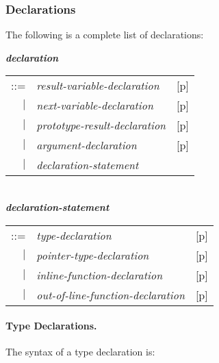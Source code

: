 \documentclass[12pt]{article}
\newcommand{\subsubsubsection}[1]{\paragraph[#1]{#1.}}
\newcommand{\emkey}[1]{{\em \bfseries #1}}
\newcommand{\pagref}[1]{p\pageref{#1}}
\newenvironment{indpar}[1][0.3in]%
	{\begin{list}{}%
		     {\setlength{\itemsep}{0in}%
		      \setlength{\topsep}{0in}%
		      \setlength{\parsep}{1ex}%
		      \setlength{\labelwidth}{#1}%
		      \setlength{\leftmargin}{#1}%
		      \addtolength{\leftmargin}{\labelsep}}%
	 \item}%
	{\end{list}}
\begin{document}
\subsubsection{Declarations}
\label{DECLARATIONS}

The following is a complete list of declarations:
\begin{indpar}
\emkey{declaration}\label{DECLARATION}
    \begin{tabular}[t]{@{}rll}
    ::= & {\em result-variable-declaration}
        & [\pagref{RESULT-VARIABLE-DECLARATION}] \\
    $|$ & {\em next-variable-declaration}
        & [\pagref{NEXT-VARIABLE-DECLARATION}] \\
    $|$ & {\em prototype-result-declaration}
        & [\pagref{PROTOTYPE-RESULT-DECLARATION}] \\
    $|$ & {\em argument-declaration}
        & [\pagref{ARGUMENT-DECLARATION}] \\
    $|$ & {\em declaration-statement} \\
    \end{tabular}
\\[0.5ex]
\emkey{declaration-statement}\label{DECLARATION-STATEMENT}
    \begin{tabular}[t]{@{}rll}
    ::= & {\em type-declaration}
        & [\pagref{TYPE-DECLARATIONS}] \\
    $|$ & {\em pointer-type-declaration}
        & [\pagref{POINTER-TYPE-DECLARATIONS}] \\
    $|$ & {\em inline-function-declaration}
        & [\pagref{INLINE-FUNCTION-DECLARATIONS}] \\
    $|$ & {\em out-of-line-function-declaration}
        & [\pagref{OUT-OF-LINE-FUNCTION-DECLARATIONS}] \\
    \end{tabular}
\end{indpar}


\subsubsubsection{Type Declarations}
\label{TYPE-DECLARATIONS}

The syntax of a type declaration is:
\end{document}
